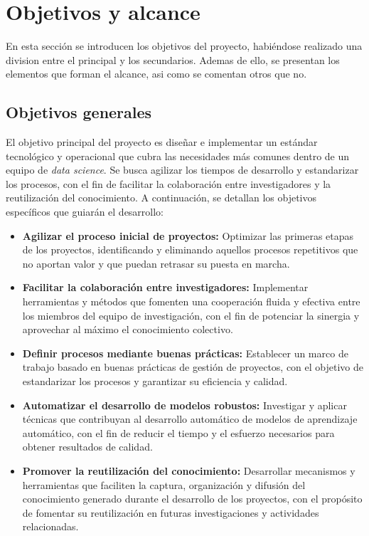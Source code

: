 \section{Objetivos y alcance}
En esta sección se introducen los objetivos del 
proyecto, habiéndose realizado una division entre el principal y los
secundarios. Ademas de ello, se presentan los elementos que forman el alcance,
asi como se comentan otros que no.

\subsection{Objetivos generales}
El objetivo principal del proyecto es diseñar e implementar un estándar tecnológico y 
operacional que cubra las necesidades más comunes dentro de un equipo de \textit{data science}. Se 
busca agilizar los tiempos de desarrollo y estandarizar los procesos, con el fin de
facilitar la colaboración entre investigadores y la reutilización del conocimiento. A
continuación, se detallan los objetivos específicos que guiarán el desarrollo:

\begin{itemize}
    \item \textbf{Agilizar el proceso inicial de proyectos:} Optimizar las primeras etapas 
    de los proyectos, identificando y eliminando aquellos procesos repetitivos que no aportan
    valor y que puedan retrasar su puesta en marcha. 
    \item \textbf{Facilitar la colaboración entre investigadores:} Implementar herramientas y 
    métodos que fomenten una cooperación fluida y efectiva entre los miembros del equipo de 
    investigación, con el fin de potenciar la sinergia y aprovechar al máximo el conocimiento 
    colectivo.
    \item \textbf{Definir procesos mediante buenas prácticas:} Establecer un marco de trabajo 
    basado en buenas prácticas de gestión de proyectos, con el objetivo de estandarizar los 
    procesos y garantizar su eficiencia y calidad.
    \item \textbf{Automatizar el desarrollo de modelos robustos:} Investigar y aplicar 
    técnicas que contribuyan al desarrollo automático de modelos de aprendizaje automático,
    con el fin de reducir el tiempo y el esfuerzo necesarios para obtener resultados de calidad.
    \item \textbf{Promover la reutilización del conocimiento:} Desarrollar mecanismos y herramientas 
    que faciliten la captura, organización y difusión del conocimiento generado durante el desarrollo 
    de los proyectos, con el propósito de fomentar su reutilización en futuras investigaciones y 
    actividades relacionadas.
\end{itemize}

